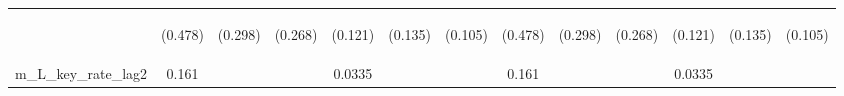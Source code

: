 \documentclass[]{article}
\begin{document}
\begin{center}
\begin{tabular}{lcccccccccccc}
\vspace{4pt} & \begin{footnotesize}(0.478)\end{footnotesize} & \begin{footnotesize}(0.298)\end{footnotesize} & \begin{footnotesize}(0.268)\end{footnotesize} & \begin{footnotesize}(0.121)\end{footnotesize} & \begin{footnotesize}(0.135)\end{footnotesize} & \begin{footnotesize}(0.105)\end{footnotesize} & \begin{footnotesize}(0.478)\end{footnotesize} & \begin{footnotesize}(0.298)\end{footnotesize} & \begin{footnotesize}(0.268)\end{footnotesize} & \begin{footnotesize}(0.121)\end{footnotesize} & \begin{footnotesize}(0.135)\end{footnotesize} & \begin{footnotesize}(0.105)\end{footnotesize} \\
m\_L\_key\_rate\_lag2 & 0.161 &  &  & 0.0335 &  &  & 0.161 &  &  & 0.0335 &  &  \\

\end{tabular}
\end{center}
\end{document}

